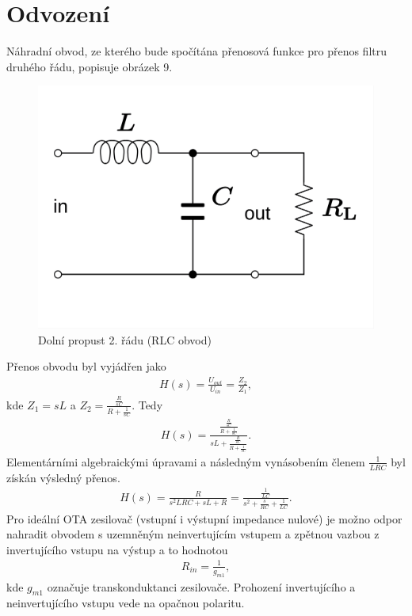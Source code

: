 \documentclass[twoside]{article}
\begin{document}
\section{Odvození}
Náhradní obvod, ze kterého bude spočítána přenosová funkce pro přenos filtru druhého řádu, popisuje obrázek 9.
\begin{figure}[H]
\centering
\includegraphics[scale=0.15]{RLC_low-pass.png}
\caption{Dolní propust 2. řádu (RLC obvod) \cite{7}}
\end{figure}
\noindent Přenos obvodu byl vyjádřen jako
\begin{align}
H(s) = \frac{U_{out}}{U_{in}} = \frac{Z_2}{Z_1},
\end{align}
kde $Z_1 = sL$ a $Z_2 = \frac{\frac{R}{sC}}{R + \frac{1}{sC}}$. Tedy
\begin{align}
H(s) = \frac{\frac{\frac{R}{sC}}{R + \frac{1}{sC}}}{sL + \frac{\frac{R}{sC}}{R + \frac{1}{sC}}}.
\end{align}
Elementárními algebraickými úpravami a následným vynásobením členem $\frac{1}{LRC}$ byl získán výsledný přenos.
\begin{align}
H(s) = \frac{R}{s^2LRC + sL + R} = \frac{\frac{1}{LC}}{s^2 + \frac{s}{RC} + \frac{1}{LC}}.
\end{align}
\noindent Pro ideální OTA zesilovač (vstupní i výstupní impedance nulové) je možno odpor nahradit obvodem s uzemněným neinvertujícím vstupem a zpětnou vazbou z invertujícího vstupu na výstup a to hodnotou
\begin{align}
R_{in} = \frac{1}{g_{m1}},
\end{align}
kde $g_{m1}$ označuje transkonduktanci zesilovače. Prohození invertujícího a neinvertujícího vstupu vede na opačnou polaritu.
\end{document}
